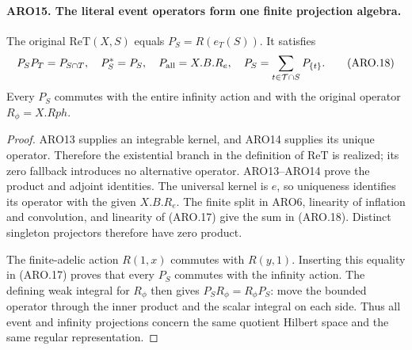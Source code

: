 \documentclass[11pt,a4paper]{article}
\numberwithin{equation}{section}
\theoremstyle{remark}\newtheorem{remark}[theorem]{Remark}
\begin{document}
\paragraph{ARO15. The literal event operators form one finite projection algebra.}
\label{claim:ARO15}
The original \(\mathrm{ReT}(X,S)\) equals \(P_S=R(e_T(S))\).
It satisfies
\[
 P_SP_T=P_{S\cap T},\quad P_S^*=P_S,\quad
 P_{\rm all}=X.B.R_e,
 \quad P_S=\sum_{t\in\mathcal T\cap S}P_{\{t\}}.
 \tag{ARO.18}
\]
Every \(P_S\) commutes with the entire infinity action and with
the original operator \(R_\phi=X.Rph\).
\begin{proof}
ARO13 supplies an integrable kernel, and ARO14 supplies its unique
operator.  Therefore the existential branch in the definition of
\(\mathrm{ReT}\) is realized; its zero fallback introduces no
alternative operator.  ARO13--ARO14 prove the product and adjoint
identities.  The universal kernel is \(e\), so uniqueness identifies
its operator with the given \(X.B.R_e\).  The finite split in ARO6,
linearity of inflation and convolution, and linearity of (ARO.17)
give the sum in (ARO.18).  Distinct singleton projectors therefore
have zero product.

The finite-adelic action \(R(1,x)\) commutes with \(R(y,1)\).
Inserting this equality in (ARO.17) proves that every \(P_S\)
commutes with the infinity action.  The defining weak integral for
\(R_\phi\) then gives \(P_SR_\phi=R_\phi P_S\): move the bounded
operator through the inner product and the scalar integral on
each side.  Thus all event and infinity projections concern the
same quotient Hilbert space and the same regular representation.
\end{proof}

\end{document}
